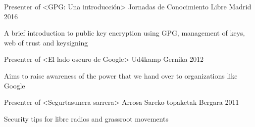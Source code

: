 

\begin{cventries}

  \cventry
    {Presenter of <GPG: Una introducción>} %
    {Jornadas de Conocimiento Libre} %
    {Madrid} %
    {2016} %
    {
      \begin{cvitems} %
        \item {A brief introduction to public key encryption using GPG,
            management of keys, web of trust and keysigning}
      \end{cvitems}
    }

  \cventry
    {Presenter of <El lado oscuro de Google>} %
    {Ud4kamp} %
    {Gernika} %
    {2012} %
    {
      \begin{cvitems} %
        \item {Aims to raise awareness of the power that we hand over to
            organizations like Google}
      \end{cvitems}
    }

  \cventry
    {Presenter of <Segurtasunera sarrera>} %
    {Arrosa Sareko topaketak} %
    {Bergara} %
    {2011} %
    {
      \begin{cvitems} %
        \item {Security tips for libre radios and grassroot movements}
      \end{cvitems}
    }

\end{cventries}
